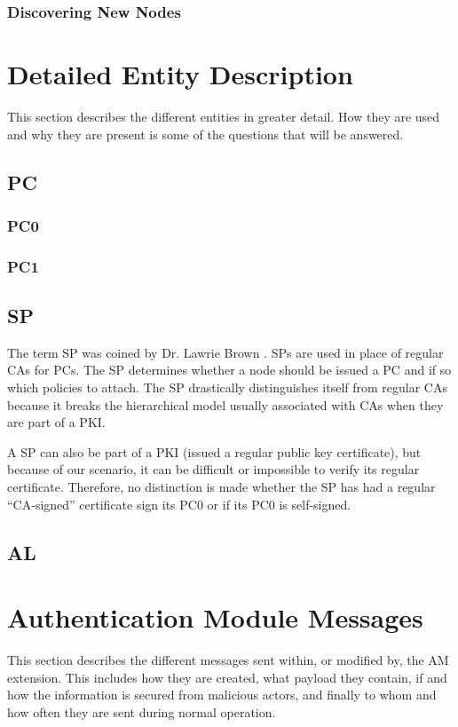\subsubsection*{Discovering New Nodes}


\section{Detailed Entity Description}
This section describes the different entities in greater detail. How they are
used and why they are present is some of the questions that will be answered.

\subsection{\acf{PC}}


\subsubsection*{\acf{PC0}}

\subsubsection*{\acf{PC1}}

\subsection{\acf{SP}}
The term \acl{SP} was coined by Dr. Lawrie Brown \cite{lawrie:technotes}.
\acp{SP} are used in place of regular \acp{CA} for \acp{PC}. The \ac{SP}
determines whether a node should be issued a \ac{PC} and if so which policies to
attach. The \ac{SP} drastically distinguishes itself from regular \acp{CA}
because it breaks the hierarchical model usually associated with \acp{CA} when
they are part of a \ac{PKI}.

A \ac{SP} can also be part of a \ac{PKI} (issued a regular public key
certificate), but because of our scenario, it can be difficult or impossible to
verify its regular certificate. Therefore, no distinction is made whether the
\ac{SP} has had a regular ``\ac{CA}-signed'' certificate sign its \ac{PC0} or if
its \ac{PC0} is self-signed.


\subsection{\acf{AL}}


\section{Authentication Module Messages}
This section describes the different messages sent within, or modified by, the
\ac{AM} extension. This includes how they are created, what payload they
contain, if and how the information is secured from malicious actors, and
finally to whom and how often they are sent during normal operation.

